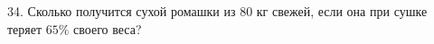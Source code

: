 34. Сколько получится сухой ромашки из 80 кг свежей, если она при сушке теряет $65\%$ своего веса?\\
